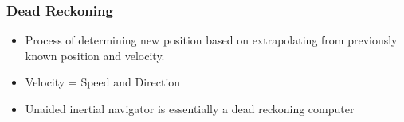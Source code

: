

\begin{frame}
\frametitle{Dead Reckoning}
\begin{itemize}
  \item Process of determining new position based on extrapolating from previously known position and velocity.
  \item Velocity = Speed and Direction
  \item Unaided inertial navigator is essentially a dead reckoning computer
\end{itemize} 
\end{frame}





